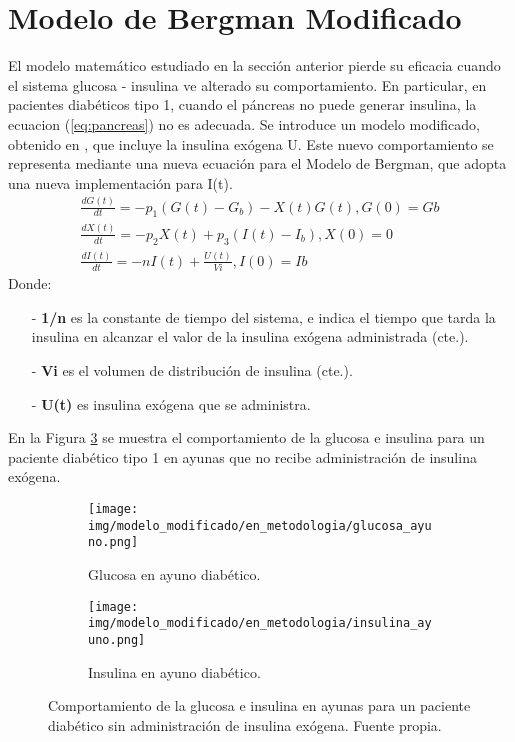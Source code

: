 \section{Modelo de Bergman Modificado}
\label{sec:indicar_n}
El modelo matemático estudiado en la sección anterior pierde su eficacia cuando el sistema glucosa - insulina ve alterado su comportamiento. En particular, en pacientes diabéticos tipo 1, cuando el páncreas no puede generar insulina, la ecuacion (\ref{eq:pancreas}) no es adecuada. 
Se introduce un modelo modificado,  obtenido en \cite{zamarron2021modelos}, que incluye la insulina exógena U. Este nuevo comportamiento se representa mediante una nueva ecuación para el Modelo de Bergman, que adopta una nueva implementación para I(t).
\begin{align}
    \frac{dG(t)}{dt}= -p_1 (G(t) - G_b) - X(t)G(t), G(0)=Gb \\ \label{eq:glucosa_mod_mod}
    \frac{dX(t)}{dt}= -p_2 X(t) + p_3(I(t) - I_b), X(0) = 0 \\
    \frac{dI(t)}{dt}= -n I(t) + \frac{U(t)}{Vi}, I(0) = Ib 
    \label{eq:ecBergMod}
\end{align}
Donde:
\begin{enumerate}
    \item[-] \textbf{1/n} es la constante de tiempo del sistema, e indica el tiempo que tarda la insulina en alcanzar el valor de la insulina exógena administrada (cte.). 
    \item[-] \textbf{Vi} es el volumen de distribución de insulina (cte.). 
    \item[-] \textbf{U(t)} es insulina exógena que se administra. 
\end{enumerate}

En la Figura \ref{fig:modificado_comportamiento_ayuno} se muestra el comportamiento de la glucosa e insulina para un paciente diabético tipo 1 en ayunas que no recibe administración de insulina exógena.

\begin{figure}[htbp]
    \centering
    \begin{subfigure}[b]{0.9\linewidth} %
        \centering
        \texttt{[image: img/modelo\_modificado/en\_metodologia/glucosa\_ayuno.png]}
        \caption{Glucosa en ayuno diabético.}
        \label{fig:mod_ayuno}
    \end{subfigure}
    
    \vspace{0.5cm} %

    \begin{subfigure}[b]{0.9\linewidth} %
        \centering
        \texttt{[image: img/modelo\_modificado/en\_metodologia/insulina\_ayuno.png]}
        \caption{Insulina en ayuno diabético.}
        \label{fig:mode_ayuno_insu}
    \end{subfigure}
    
    \caption{Comportamiento de la glucosa e insulina en ayunas para un paciente diabético sin administración de insulina exógena. Fuente propia.}
    \label{fig:modificado_comportamiento_ayuno}
\end{figure}


